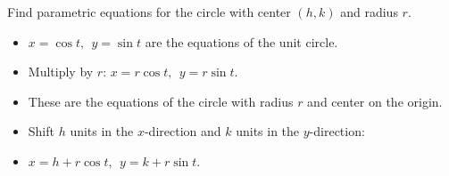 \begin{frame}
\begin{example} %
Find parametric equations for the circle with center $(h, k)$ and radius $r$.
\begin{itemize}
\item<2->  $x = \cos t,\ \  y = \sin t$ are the equations of the unit circle.
\item<3->  Multiply by $r$: $x = r\cos t,\ \  y = r\sin t$.
\item<4->  These are the equations of the circle with radius $r$ and center on the origin.
\item<5->  Shift $h$ units in the $x$-direction and $k$ units in the $y$-direction:
\item<5->  $x = h + r\cos t,\ \  y = k+ r\sin t$.
\end{itemize}
\end{example}
\end{frame}
